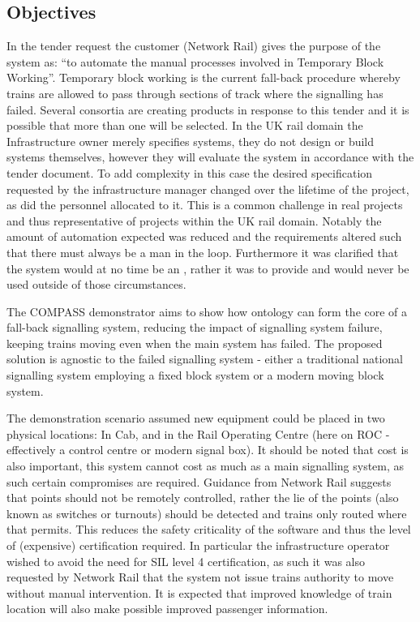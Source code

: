\subsection{Objectives}
In the tender request the customer (Network Rail) gives the purpose of the system as: ``to automate the manual processes involved in Temporary Block Working''. Temporary block working is the current fall-back procedure whereby trains are allowed to pass through sections of track where the signalling has failed. Several consortia are creating products in response to this tender and it is possible that more than one will be selected. In the UK rail domain the Infrastructure owner merely specifies systems, they do not design or build systems themselves, however they will evaluate the system in accordance with the tender document. To add complexity in this case the desired specification requested by the infrastructure manager changed over the lifetime of the project, as did the personnel allocated to it. This is a common challenge in real projects and thus representative of projects within the UK rail domain. Notably the amount of automation expected was reduced and the requirements altered such that there must always be a man in the loop. Furthermore it was clarified that the system would at no time be an , rather it was to provide  and would never be used outside of those circumstances. 

The COMPASS demonstrator aims to show how ontology can form the core of a fall-back signalling system, reducing the impact of signalling system failure, keeping trains moving even when the main system has failed. The proposed solution is agnostic to the failed signalling system - either a traditional national signalling system employing a fixed block system or a modern moving block system.

The demonstration scenario assumed new equipment could be placed in two physical locations: In Cab, and in the Rail Operating Centre (here on ROC - effectively a control centre or modern signal box). It should be noted that cost is also important, this system cannot cost as much as a main signalling system, as such certain compromises are required. Guidance from Network Rail suggests that points should not be remotely controlled, rather the lie of the points (also known as switches or turnouts) should be detected and trains only routed where that permits. This reduces the safety criticality of the software and thus the level of (expensive) certification required. In particular the infrastructure operator wished to avoid the need for SIL level 4 certification, as such it was also requested by Network Rail that the system not issue trains authority to move without manual intervention. It is expected that improved knowledge of train location will also make possible improved passenger information.

